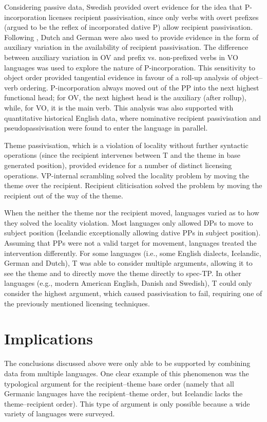 Considering passive data, Swedish provided overt evidence for the idea that P-incorporation licenses recipient passivisation, since only verbs with overt prefixes (argued to be the reflex of incorporated dative P) allow recipient passivisation. Following \cite{Alexiadou.2014}, Dutch and German were also used to provide evidence in the form of auxiliary variation in the availability of recipient passivisation. The difference between auxiliary variation in OV and prefix vs. non-prefixed verbs in VO languages was used to explore the nature of P-incorporation. This sensitivity to object order provided tangential evidence in favour of a roll-up analysis of object--verb ordering. P-incorporation always moved out of the PP into the next highest functional head; for OV, the next highest head is the auxiliary (after rollup), while, for VO, it is the main verb. This analysis was also supported with quantitative historical English data, where nominative recipient passivisation and pseudopassivisation were found to enter the language in parallel.

Theme passivisation, which is a violation of locality without further syntactic operations (since the recipient intervenes between T and the theme in base generated position), provided evidence for a number of distinct licensing operations. VP-internal scrambling solved the locality problem by moving the theme over the recipient. Recipient cliticisation solved the problem by moving the recipient out of the way of the theme.

When the neither the theme nor the recipient moved, languages varied as to how they solved the locality violation. Most languages only allowed DPs to move to subject position (Icelandic exceptionally allowing dative PPs in subject position). Assuming that PPs were not a valid target for movement, languages treated the intervention differently. For some languages (i.e., some English dialects, Icelandic, German and Dutch), T was able to consider multiple arguments, allowing it to see the theme and to directly move the theme directly to spec-TP. In other languages (e.g., modern American English, Danish and Swedish), T could only consider the highest argument, which caused passivisation to fail, requiring one of the previously mentioned licensing techniques.

\section{Implications}
The conclusions discussed above were only able to be supported by combining data from multiple languages. One clear example of this phenomenon was the typological argument for the recipient--theme base order (namely that all Germanic languages have the recipient--theme order, but Icelandic lacks the theme--recipient order). This type of argument is only possible because a wide variety of languages were surveyed.

